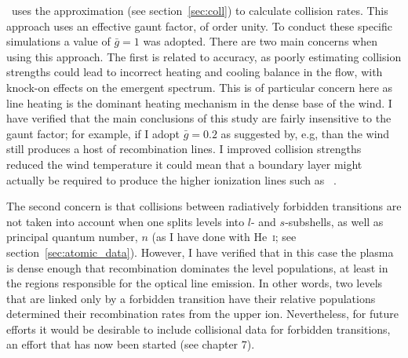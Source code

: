 \py\ uses the \cite{vanregemorter} approximation 
(see section~\ref{sec:coll}) to calculate collision rates.
This approach uses an effective gaunt factor, of
order unity. To conduct these specific simulations a value of $\bar{g}=1$ 
was adopted. There are two main concerns when using this approach.
The first is related to accuracy, as poorly estimating collision strengths
could lead to incorrect heating and cooling balance in the flow, with
knock-on effects on the emergent spectrum. This is of particular concern
here as line heating is the dominant heating mechanism in the dense 
base of the wind. I have verified that the main conclusions of this study
are fairly insensitive to the gaunt factor; for example, if I adopt
$\bar{g}=0.2$ as suggested by, e.g, \citep{ferland2005} than the wind still
produces a host of recombination lines. 
I improved collision strengths reduced the wind temperature it 
could mean that a boundary layer might
actually be required to produce the higher ionization lines such as 
\heiiopt\ \citep[see e.g.][]{hoare1991}.

The second concern is that 
collisions between radiatively forbidden transitions are not taken into 
account when one splits levels into $l$- and $s$-subshells, as well
as principal quantum number, $n$ (as I have done with He~\textsc{i}; 
see section~\ref{sec:atomic_data}). However, I have verified that
in this case the plasma is dense enough that recombination 
dominates the level populations, at least in 
the regions responsible for the optical line emission. In other words, two levels
that are linked only by a forbidden transition have their relative populations
determined their recombination rates from the upper ion.
Nevertheless, for future efforts it would be desirable to include
collisional data for forbidden transitions, an effort that has now
been started (see chapter 7).






